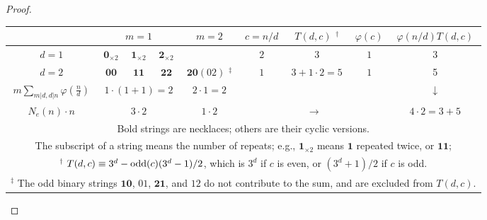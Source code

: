 \documentclass{ws-ijbc}
\begin{document}
\begin{proof}
\begin{table}[h]\footnotesize
\tbl{
Two ways of counting the $N_e(2) = 4$ ternary necklaces for $n = 2$.
}
{
\begin{tabular}{c | c  c c | c  | c | c | c | c }
\hline
        & \multicolumn{3}{c|}{$m = 1$}
        & $m = 2$
        & $c = n/d$
        & $T(d, c)$ $^\dagger$
        & $\varphi(c)$ & $\varphi(n/d) T(d, c)$\\
\hline
$d = 1$ & \hspace{1mm} $\mathbf{0}_{\times2}$ \hspace{1mm}
        & \hspace{1mm} $\mathbf{1}_{\times2}$ \hspace{1mm}
        & \hspace{1mm} $\mathbf{2}_{\times2}$ \hspace{1mm}
        & & $2$ & $3$ & $1$ & 3 \\
\hline
$d = 2$ & $\mathbf{00}$
        & $\mathbf{11}$
        & $\mathbf{22}$
        & \hspace{1mm} $\mathbf{20} (02)$ $^\ddagger$ \hspace{1mm}
        & $1$ & $3+1\cdot2=5$ & $1$ & 5 \\
\hline
$m \sum_{m|d, d|n} \varphi(\frac{n}{d})$
      & \multicolumn{3}{c|}{$1\cdot(1+1) = 2$}
      & $2\cdot1 = 2$ &    \multicolumn{3}{c|}{} &  $\downarrow$\\
\hline
$N_e(n)\cdot n$
    & \multicolumn{3}{c|}{$3 \cdot 2$} & $1 \cdot 2$ &
  \multicolumn{3}{c|}{$\rightarrow$} & $4\cdot2 = 3 + 5$ \\
\hline
\multicolumn{9}{p{\linewidth}}{
  Bold strings are necklaces; others are their cyclic versions.
}
\\
\multicolumn{9}{p{\linewidth}}{
The subscript of a string means the number of repeats;
e.g.,
$\mathbf{1}_{\times2}$ means $\mathbf{1}$ repeated twice, or $\mathbf{11}$;
}
\\
\multicolumn{9}{p{\linewidth}}{
$^\dagger$ $T(d, c) \equiv 3^d - \mathrm{odd}(c)(3^d-1)/2$,
which is $3^d$ if $c$ is even,
or $(3^d+1)/2$ if $c$ is odd.
}
\\
\multicolumn{9}{p{\linewidth}}{
$^\ddagger$
The odd binary strings $\mathbf{10}$, $01$, $\mathbf{21}$, and $12$
  do not contribute to the sum, and are excluded from $T(d, c)$.
}
\\
\hline
\end{tabular}
\label{tab:countcubnecklace}
}
\end{table}






\end{proof}
\end{document}
